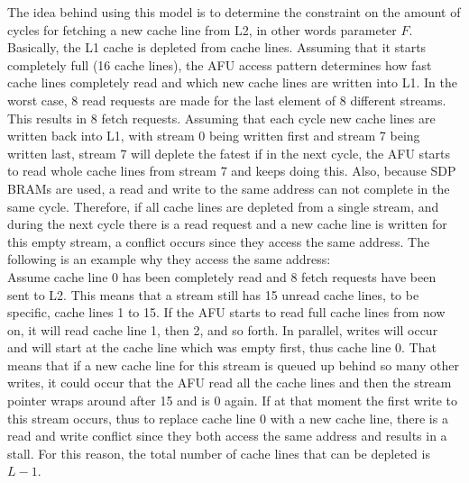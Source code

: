 The idea behind using this model is to determine the constraint on the amount of cycles for fetching a new cache line from L2, in other words parameter $F$. Basically, the L1 cache is depleted from cache lines. Assuming that it starts completely full (16 cache lines), the AFU access pattern determines how fast cache lines completely read and which new cache lines are written into L1. In the worst case, 8 read requests are made for the last element of 8 different streams. This results in 8 fetch requests. Assuming that each cycle new cache lines are written back into L1, with stream 0 being written first and stream 7 being written last, stream 7 will deplete the fatest if in the next cycle, the AFU starts to read whole cache lines from stream 7 and keeps doing this. Also, because SDP BRAMs are used, a read and write to the same address can not complete in the same cycle. Therefore, if all cache lines are depleted from a single stream, and during the next cycle there is a read request and a new cache line is written for this empty stream, a conflict occurs since they access the same address. The following is an example why they access the same address:\\
Assume cache line 0 has been completely read and 8 fetch requests have been sent to L2. This means that a stream still has 15 unread cache lines, to be specific, cache lines 1 to 15. If the AFU starts to read full cache lines from now on, it will read cache line 1, then 2, and so forth. In parallel, writes will occur and will start at the cache line which was empty first, thus cache line 0. That means that if a new cache line for this stream is queued up behind so many other writes, it could occur that the AFU read all the cache lines and then the stream pointer wraps around after 15 and is 0 again. If at that moment the first write to this stream occurs, thus to replace cache line 0 with a new cache line, there is a read and write conflict since they both access the same address and results in a stall. For this reason, the total number of cache lines that can be depleted is $L - 1$.\\

